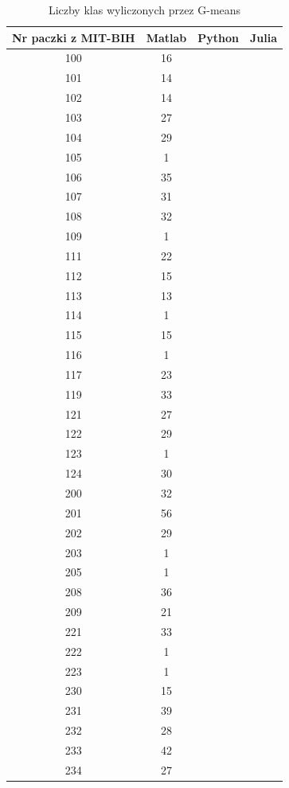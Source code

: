 \begin{table}[!tp]
	\centering
	\caption{Liczby klas wyliczonych przez G-means}
	\label{tabResults2}
	\begin{tabular}{|c|c|c|c|}
		\hline
		Nr paczki z MIT-BIH & Matlab & Python & Julia\\ \hline		
		100 & 16 &  & \\ \hline
		101 & 14 &  & \\ \hline
		102 & 14 &  & \\ \hline
		103 & 27 &  & \\ \hline
		104 & 29 &  & \\ \hline
		105 &  1 &  & \\ \hline
		106 & 35 &  & \\ \hline
		107 & 31 &  & \\ \hline
		108 & 32 &  & \\ \hline
		109 &  1 &  & \\ \hline
		111 & 22 &  & \\ \hline
		112 & 15 &  & \\ \hline
		113 & 13 &  & \\ \hline
		114 &  1 &  & \\ \hline
		115 & 15 &  & \\ \hline
		116 &  1 &  & \\ \hline
		117 & 23 &  & \\ \hline
		119 & 33 &  & \\ \hline
		121 & 27 &  & \\ \hline
		122 & 29 &  & \\ \hline
		123 &  1 &  & \\ \hline
		124 & 30 &  & \\ \hline
		200 & 32 &  & \\ \hline
		201 & 56 &  & \\ \hline
		202 & 29 &  & \\ \hline
		203 &  1 &  & \\ \hline
		205 &  1 &  & \\ \hline
		208 & 36 &  & \\ \hline
		209 & 21 &  & \\ \hline
		221 & 33 &  & \\ \hline
		222 &  1 &  & \\ \hline
		223 &  1 &  & \\ \hline
		230 & 15 &  & \\ \hline
		231 & 39 &  & \\ \hline
		232 & 28 &  & \\ \hline
		233 & 42 &  & \\ \hline
		234 & 27 &  & \\ \hline
	\end{tabular}
\end{table}

